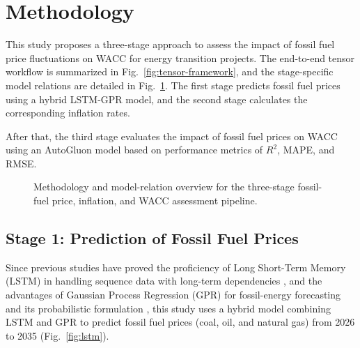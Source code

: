 \section{Methodology}

This study proposes a three-stage approach to assess the impact of fossil fuel price fluctuations on WACC for energy transition projects. The end-to-end tensor workflow is summarized in Fig.~\ref{fig:tensor-framework}, and the stage-specific model relations are detailed in Fig.~\ref{fig:methodology-model-relations}. The first stage predicts fossil fuel prices using a hybrid LSTM-GPR model, and the second stage calculates the corresponding inflation rates.

After that, the third stage evaluates the impact of fossil fuel prices on WACC using an AutoGluon model based on performance metrics of $R^2$, MAPE, and RMSE.

\begin{figure}[t]
    \centering
    \caption{Methodology and model-relation overview for the three-stage fossil-fuel price, inflation, and WACC assessment pipeline.}
    \label{fig:methodology-model-relations}
\end{figure}

\subsection{Stage 1: Prediction of Fossil Fuel Prices}

Since previous studies have proved the proficiency of Long Short-Term Memory (LSTM) in handling sequence data with long-term dependencies \cite{ALSELWI2024102068,LINDEMANN2021650}, and the advantages of Gaussian Process Regression (GPR) for fossil-energy forecasting \cite{LAHMIRI2024105008} and its probabilistic formulation \cite{rasmussen2003gaussian}, this study uses a hybrid model combining LSTM and GPR to predict fossil fuel prices (coal, oil, and natural gas) from 2026 to 2035 (Fig.~\ref{fig:lstm}).

